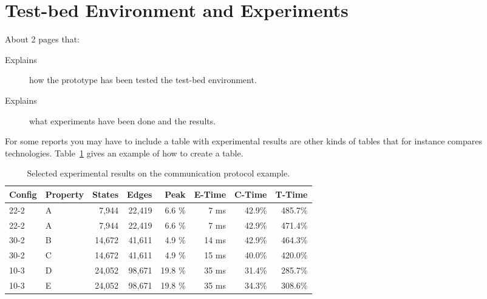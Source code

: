 \section{Test-bed Environment and Experiments}
\label{sec:evaluation}

About 2 pages that:

\begin{description}
\item[Explains] how the prototype has been tested the test-bed environment.

\item[Explains] what experiments have been done and the results.

\end{description}

For some reports you may have to include a table with experimental
results are other kinds of tables that for instance compares
technologies. Table~\ref{tab:results} gives an example of how to create a table.

\begin{table}[h!]
\centering
\begin{tabular}{llrrrrrr}
  Config & Property & States & Edges & Peak & E-Time & C-Time & T-Time
  \\ \hline \hline
22-2 & A   &    7,944  &   22,419  &  6.6  \%  &  7 ms & 42.9\% &  485.7\% \\
22-2 & A   &    7,944  &   22,419  &  6.6  \%  &  7 ms & 42.9\% &  471.4\% \\
30-2 & B   &   14,672  &   41,611  &  4.9  \%  & 14 ms & 42.9\% &  464.3\% \\
30-2 & C   &   14,672  &   41,611  &  4.9  \%  & 15 ms & 40.0\% &  420.0\% \\ \hline
10-3 & D   &   24,052  &   98,671  & 19.8  \%  & 35 ms & 31.4\% &  285.7\% \\
10-3 & E   &   24,052  &   98,671  & 19.8  \%  & 35 ms & 34.3\% &  308.6\% \\
\hline \hline
\end{tabular}
\caption{Selected experimental results on the communication protocol example.}
\label{tab:results}
\end{table}
